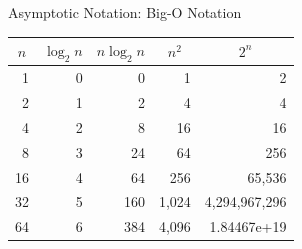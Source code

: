 \documentclass[14pt,aspectratio=1610]{beamer}
\begin{document}
\begin{frame}{Asymptotic Notation: Big-O Notation}
\begin{table}[]
{
\rmfamily
\begin{tabular}{
>{}r r r r r }
\toprule
\multicolumn{1}{c}{$n$} & \multicolumn{1}{c}{$\log_2{n}$} & \multicolumn{1}{c}{$n \log_2{n}$} & \multicolumn{1}{c}{$n^2$} & \multicolumn{1}{c}{$2^n$} \\
\midrule
1               & 0     &   0                   & 1                & 2             \\
2               & 1     &   2                   & 4                & 4             \\
4               & 2     &   8                   & 16               & 16            \\
8               & 3     &  24                   & 64               & 256           \\
16              & 4     &  64                   & 256              & 65,536        \\
32              & 5     & 160                   & 1,024            & 4,294,967,296 \\
64              & 6     & 384                   & 4,096            & 1.84467e+19   \\
\bottomrule%
\end{tabular}
}
\end{table}
\end{frame}
\end{document}
